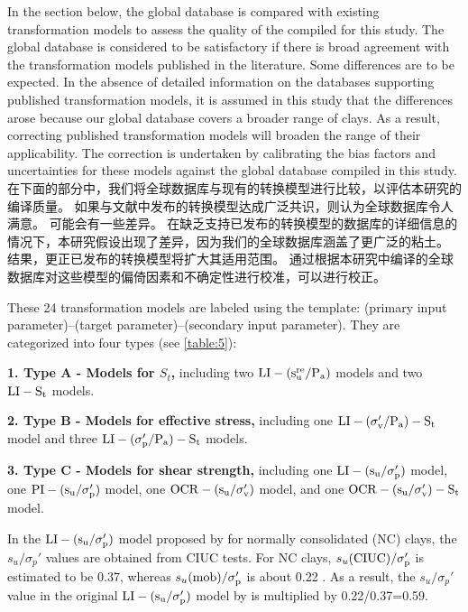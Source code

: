 \begin{Parallel}{0.60\textwidth}{}
    \ParallelLText
    {
        In the section below, the global database is compared with existing transformation models to assess the quality of the  compiled for this study. The global database is considered to be satisfactory if there is broad agreement with the transformation models published in the literature. Some differences are to be expected. In the absence of detailed information on the databases supporting published transformation models, it is assumed in this study that the differences arose because our global database covers a broader range of clays. As a result, correcting published transformation models will broaden the range of their applicability. The correction is undertaken by calibrating the bias factors and uncertainties for these models against the global database compiled in this study.
    }
    \ParallelRText
    {
        在下面的部分中，我们将全球数据库与现有的转换模型进行比较，以评估本研究的编译质量。 如果与文献中发布的转换模型达成广泛共识，则认为全球数据库令人满意。 可能会有一些差异。 在缺乏支持已发布的转换模型的数据库的详细信息的情况下，本研究假设出现了差异，因为我们的全球数据库涵盖了更广泛的粘土。 结果，更正已发布的转换模型将扩大其适用范围。 通过根据本研究中编译的全球数据库对这些模型的偏倚因素和不确定性进行校准，可以进行校正。
    }
    \ParallelPar
    \ParallelLText
    {
        These 24 transformation models are labeled using the template: (primary input parameter)–(target parameter)–(secondary input parameter). They are categorized into four types (see \autoref{table:5}):

        \textbf{1. Type A - Models for $S_t$,} including two $\rm{LI}-(s_u^{re}/P_a)$ models and two $\rm{LI}-S_t$ models.

        \textbf{2. Type B - Models for effective stress,} including one $\rm{LI}-(\sigma_v'/P_a)-S_t$ model and three $\rm{LI}-(\sigma_p'/P_a)-S_t$ models.

        \textbf{3. Type C - Models for shear strength,} including one $\rm{LI}-(s_u/\sigma_p')$ model, one $\rm{PI}-(s_u/\sigma_p')$ model, one $\rm{OCR}-(s_u/\sigma_v')$ model, and one $\rm{OCR}-(s_u/\sigma_v')-S_t$ model. 

        In the $\rm{LI}-(s_u/\sigma_p')$ model proposed by \citet{Bjerrum1960711} for normally consolidated (NC) clays, the $s_u/\sigma_p'$ values are obtained from CIUC tests. For NC clays, $s_u(\rm{CIUC})/\sigma_p'$ is estimated to be 0.37, whereas $s_u(\rm{mob})/\sigma_p'$ is about 0.22 \citep{Mesri1975409}. As a result, the $s_u/\sigma_p'$ value in the original $\rm{LI}-(s_u/\sigma_p')$ model by \citet{Bjerrum1960711} is multiplied by 0.22/0.37=0.59.

}
\end{Parallel}
